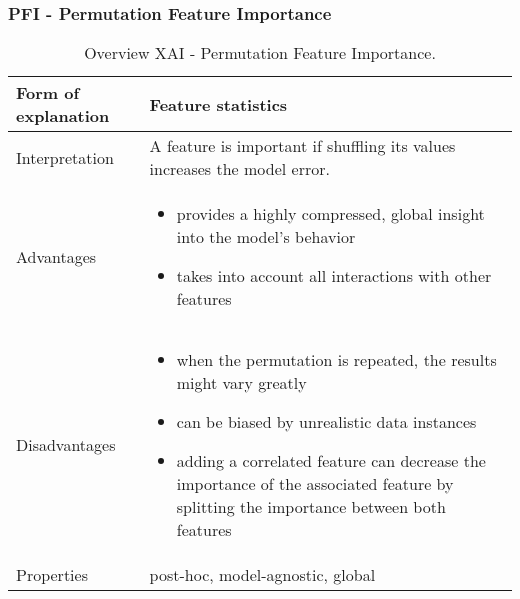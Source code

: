\subsubsection{PFI - Permutation Feature Importance}
\begin{table}[H]
  \centering
  \begin{tabular}{|p{}|p{}|}
    \hline
    Form of \newline explanation & 
    Feature statistics \\
    
    \hline
    Interpretation & 
    A feature is important if shuffling its values increases the model error. \\
    \hline
    Advantages &
    \begin{itemize}[nosep, left=0em]
        \item provides a highly compressed, global insight into the model’s behavior
        \item takes into account all interactions with other features
    \end{itemize} \\
    
    \hline
    Disadvantages &
    \begin{itemize}[nosep, left=0em]
        \item when the permutation is repeated, the results might vary greatly
        \item can be biased by unrealistic data instances
        \item adding a correlated feature can decrease the importance of the associated feature by splitting the importance between both features
    \end{itemize} \\
    
    \hline
    Properties & 
    post-hoc, model-agnostic, global  \\
    
    \hline
  \end{tabular}
  \caption{Overview XAI - Permutation Feature Importance.}
\end{table}

